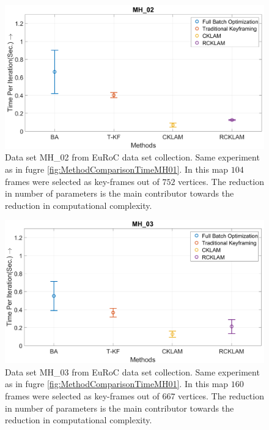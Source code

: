 \begin{figure}
	\centering
		\includegraphics[width=1.00\textwidth]{images/MethodComparisonTimeMH02.png}
  \caption{Data set MH\_02 from EuRoC \cite{Burri25012016} data set collection. Same experiment as in fugre \ref{fig:MethodComparisonTimeMH01}. In this map $104$ frames were selected as key-frames out of $752$ vertices. The reduction in number of parameters is the main contributor towards the reduction in computational complexity.}
  \label{fig:MethodComparisonTimeMH02}
\end{figure}

\begin{figure}
	\centering
		\includegraphics[width=1.00\textwidth]{images/MethodComparisonTimeMH03.png}
  \caption{Data set MH\_03 from EuRoC \cite{Burri25012016} data set collection. Same experiment as in fugre \ref{fig:MethodComparisonTimeMH01}. In this map $160$ frames were selected as key-frames out of $667$ vertices. The reduction in number of parameters is the main contributor towards the reduction in computational complexity.}
  \label{fig:MethodComparisonTimeMH03}
\end{figure}

